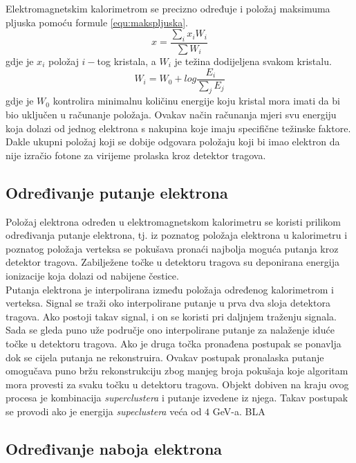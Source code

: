 \documentclass[a4paper,12pt]{report}
\begin{document}
Elektromagnetskim kalorimetrom se precizno određuje i položaj maksimuma pljuska pomoću formule \ref{equ:makspljuska}.
\begin{equation}
 x=\frac{\sum_i x_i W_i}{\sum W_i}
\label{equ:makspljuska}
\end{equation}
gdje je $x_i$ položaj $i-$tog kristala, a $W_i$ je težina dodijeljena svakom kristalu.
\begin{equation}
 W_i=W_0+log\frac{E_i}{\sum_j E_j}
\label{equ:tezina}
\end{equation}
gdje je $W_0$ kontrolira minimalnu količinu energije koju kristal mora imati da bi bio uključen u računanje položaja. Ovakav način računanja mjeri svu energiju koja dolazi od jednog elektrona s nakupina koje imaju specifične težinske faktore. Dakle ukupni položaj koji se dobije odgovara položaju koji bi imao elektron da nije izračio fotone za virijeme prolaska kroz detektor tragova.\\

\subsection{Određivanje putanje elektrona}
Položaj elektrona određen u elektromagnetskom kalorimetru se koristi prilikom određivanja putanje elektrona, tj. iz poznatog položaja elektrona u kalorimetru i poznatog položaja verteksa se pokušava pronaći najbolja moguća putanja kroz detektor tragova. Zabilježene točke u detektoru tragova su deponirana energija ionizacije koja dolazi od nabijene čestice. \\
Putanja elektrona je interpolirana između položaja određenog kalorimetrom i verteksa. Signal se traži oko interpolirane putanje u prva dva sloja detektora tragova. Ako postoji takav signal, i on se koristi pri daljnjem traženju signala. Sada se gleda puno uže područje ono interpolirane putanje za nalaženje iduće točke u detektoru tragova. Ako je druga točka pronađena postupak se ponavlja dok se cijela putanja ne rekonstruira. Ovakav postupak pronalaska putanje omogučava puno bržu rekonstrukciju zbog manjeg broja pokušaja koje algoritam mora provesti za svaku točku u detektoru tragova.
Objekt dobiven na kraju ovog procesa je kombinacija \textit{superclustera} i putanje izvedene iz njega. Takav postupak se provodi ako je energija \textit{supeclustera} veća od $4$ GeV-a. BLA


\subsection{Određivanje naboja elektrona}
\end{document}
